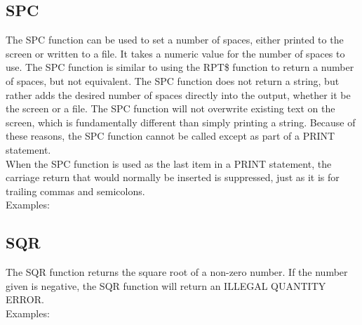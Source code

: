 \subsection{SPC}

The {\ttfamily SPC} function can be used to set a number of spaces, either
printed to the screen or written to a file.  It takes a numeric value for the
number of spaces to use.  The {\ttfamily SPC} function is similar to using the
{\ttfamily RPT\$} function to return a number of spaces, but not equivalent.
The {\ttfamily SPC} function does not return a string, but rather adds the
desired number of spaces directly into the output, whether it be the screen or
a file.  The {\ttfamily SPC} function will not overwrite existing text on the
screen, which is fundamentally different than simply printing a string.
Because of these reasons, the {\ttfamily SPC} function cannot be called except
as part of a {\ttfamily PRINT} statement.\\

When the {\ttfamily SPC} function is used as the last item in a {\ttfamily
PRINT} statement, the carriage return that would normally be inserted is
suppressed, just as it is for trailing commas and semicolons.\\

Examples:\\


\subsection{SQR}

The {\ttfamily SQR} function returns the square root of a non-zero number.  If
the number given is negative, the {\ttfamily SQR} function will return an
{\ttfamily ILLEGAL QUANTITY ERROR}.\\

Examples:\\

